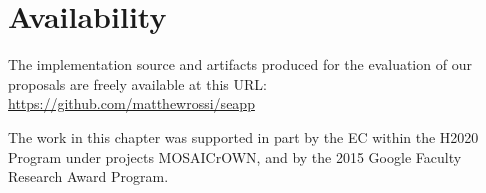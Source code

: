 











\section*{Availability}
The implementation source and artifacts produced for the evaluation of
our proposals are freely available at this URL:
\url{https://github.com/matthewrossi/seapp}

The work in this chapter was supported in part by the EC within the
H2020 Program under projects MOSAICrOWN, and by the 2015 Google
Faculty Research Award Program.
